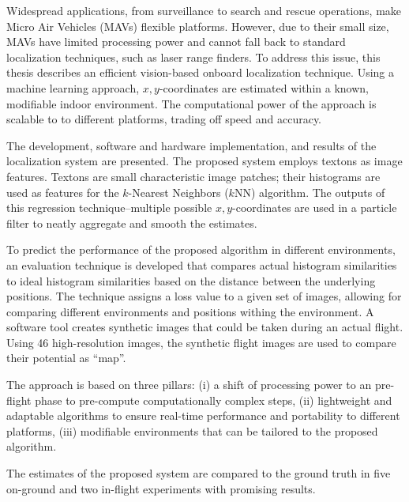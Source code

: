 Widespread applications, from surveillance to search and rescue operations, make Micro Air Vehicles (MAVs) flexible platforms.
However, due to their small size, MAVs have limited processing power and cannot
fall back to standard localization techniques, such as laser range finders. To address this
issue, this thesis describes an efficient vision-based onboard localization
technique. Using a machine
learning approach, $x,y$-coordinates are estimated within a known, modifiable indoor
environment. The computational power of the approach is scalable to to different platforms, trading off speed and accuracy.

The development, software and hardware
implementation, and results of the localization system are presented. The proposed system employs 
textons as image features. Textons are small characteristic image patches; their histograms are used as features for the $k$-Nearest Neighbors ($k$NN)
algorithm. The outputs of this regression technique--multiple possible
$x, y$-coordinates are used in a particle filter to neatly aggregate
and smooth the estimates.


To predict the performance of the proposed algorithm in different environments, an evaluation
technique is developed that compares actual histogram similarities to
ideal histogram similarities based on the distance between the underlying
positions. The technique assigns a loss value to a given set of
images, allowing for comparing different environments and positions withing the environment. A software tool creates synthetic images
that could be taken during an actual flight. Using 46 high-resolution images, the synthetic flight images are used to compare their potential as ``map''.


The approach is based on three pillars: (i) a shift of processing power to an pre-flight phase to pre-compute
computationally complex steps, (ii) lightweight and adaptable algorithms to ensure real-time performance and portability to different platforms,
(iii) modifiable environments that can be tailored to the proposed algorithm. 

The estimates of the proposed system are compared to the ground truth in five on-ground and two
in-flight experiments with promising results.
